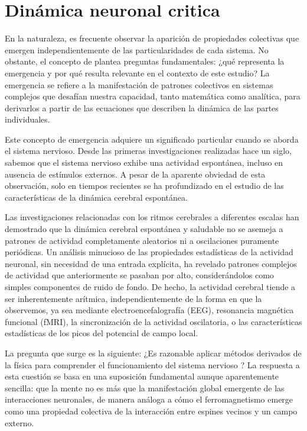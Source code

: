 \chapter{Dinámica neuronal critica}\label{cap:dinamica_critica}
\graphicspath{{figs/capitulo_critico/}}

 
 En la naturaleza, es frecuente observar la aparición de propiedades colectivas que emergen independientemente de las particularidades de cada sistema. No obstante, el concepto de  plantea preguntas fundamentales: ¿qué representa la emergencia y por qué resulta relevante en el contexto de este estudio? La emergencia se refiere a la manifestación de patrones colectivos en sistemas complejos que desafían nuestra capacidad, tanto matemática como analítica, para derivarlos a partir de las ecuaciones que describen la dinámica de las partes individuales.
 
 Este concepto de emergencia adquiere un significado particular cuando se aborda el sistema nervioso. Desde las primeras investigaciones realizadas hace un siglo, sabemos que el sistema nervioso  exhibe una actividad espontánea, incluso en ausencia de estímulos externos. A pesar de la aparente obviedad de esta observación, solo en tiempos recientes se ha profundizado en el estudio de las características de la dinámica cerebral espontánea.
 
 
 Las investigaciones relacionadas con los ritmos cerebrales a diferentes escalas han demostrado que la dinámica cerebral espontánea y saludable no se asemeja a patrones de actividad completamente aleatorios ni a oscilaciones puramente periódicas. Un análisis minucioso de las propiedades estadísticas de la actividad neuronal, sin necesidad de una entrada explícita, ha revelado patrones complejos de actividad que anteriormente se pasaban por alto, considerándolos como simples componentes de ruido de fondo. De hecho, la actividad cerebral tiende a ser inherentemente arítmica, independientemente de la forma en que la observemos, ya sea mediante electroencefalografía (EEG), resonancia magnética funcional (fMRI), la sincronización de la actividad oscilatoria, o las características estadísticas de los picos del potencial de campo local.
 
 
 La pregunta que surge es la siguiente: ¿Es razonable aplicar métodos derivados de la física para comprender el funcionamiento del sistema nervioso ? La respuesta a esta cuestión se basa en una suposición fundamental aunque aparentemente sencilla: que la mente no es más que la manifestación global emergente de las interacciones neuronales, de manera análoga a cómo el ferromagnetismo emerge como una propiedad colectiva de la interacción entre espines vecinos y un campo externo.
 

